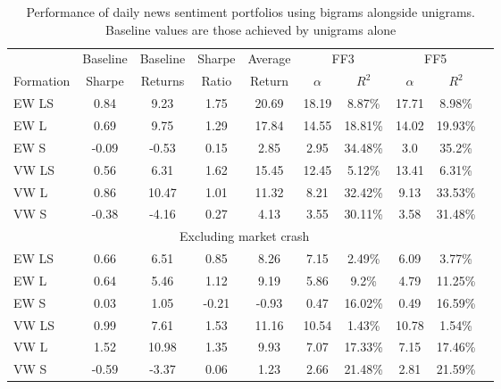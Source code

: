 \begin{table}[!ht]
\begin{center}
\begin{tabular}{l|cc|ccccccc}
      \toprule
      & Baseline & Baseline& Sharpe &  Average & \multicolumn{2}{c}{FF3} & \multicolumn{2}{c}{FF5} \\
      \cmidrule(lr){6-7}
      \cmidrule(lr){8-9}
      Formation & Sharpe & Returns & Ratio & Return &  $\alpha$ & $R^2$ & $\alpha$ & $R^2$ \\
      \midrule
 EW LS & 0.84  & 9.23 & 1.75 & 20.69 & 18.19 & 8.87\% & 17.71 & 8.98\% \\
 EW L  & 0.69  & 9.75 & 1.29 & 17.84 & 14.55 & 18.81\% & 14.02 & 19.93\% \\
 EW S  & -0.09 & -0.53 & 0.15 & 2.85 & 2.95 & 34.48\% & 3.0 & 35.2\% \\
 VW LS & 0.56  & 6.31 & 1.62 & 15.45 & 12.45 & 5.12\% & 13.41 & 6.31\% \\
 VW L  & 0.86  & 10.47 & 1.01 & 11.32 & 8.21 & 32.42\% & 9.13 & 33.53\% \\
 VW S  & -0.38 & -4.16 & 0.27 & 4.13 & 3.55 & 30.11\% & 3.58 & 31.48\% \\
 \midrule
 \multicolumn{9}{c}{Excluding market crash} \\
 \midrule
 EW LS & 0.66  & 6.51 & 0.85 & 8.26 & 7.15 & 2.49\% & 6.09 & 3.77\% \\
 EW L  & 0.64  & 5.46 & 1.12 & 9.19 & 5.86 & 9.2\% & 4.79 & 11.25\% \\
 EW S  & 0.03  & 1.05 & -0.21 & -0.93 & 0.47 & 16.02\% & 0.49 & 16.59\% \\
 VW LS & 0.99  & 7.61 & 1.53 & 11.16 & 10.54 & 1.43\% & 10.78 & 1.54\% \\
 VW L  & 1.52  & 10.98 & 1.35 & 9.93 & 7.07 & 17.33\% & 7.15 & 17.46\% \\
 VW S  & -0.59 & -3.37 & 0.06 & 1.23 & 2.66 & 21.48\% & 2.81 & 21.59\% \\
      \bottomrule
\end{tabular}
\caption[Day ahead performance with bigrams]{Performance of daily news sentiment portfolios using bigrams alongside unigrams. Baseline values are those achieved by unigrams alone}
\label{tab:other-configs-day-ahead}
\end{center}
\end{table}

